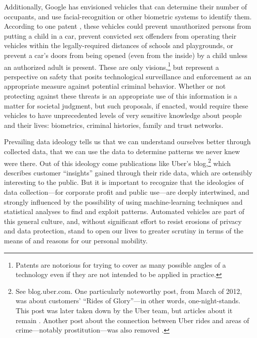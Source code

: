 Additionally, Google has envisioned vehicles that can determine their number of
occupants, and use facial-recognition or other biometric systems to
identify them. According to one patent \cite{predictPatent}, these vehicles could prevent
unauthorized persons from putting a child in a car, prevent convicted
sex offenders from operating their vehicles within the
legally-required distances of schools and playgrounds, or prevent a
car's doors from being opened (even from the inside) by a child unless
an authorized adult is present. These are only visions,\footnote{Patents
are notorious for trying to cover as many possible angles of a
technology even if they are not intended to be applied in practice.} 
but represent a perspective on safety 
that posits technological surveillance and enforcement as an
appropriate measure against potential criminal behavior. Whether or not protecting
against these threats is an appropriate use of this information is a
matter for societal judgment, but such proposals, if enacted, would
require these vehicles to have unprecedented levels of very sensitive
knowledge about people and their lives: biometrics, criminal
histories, family and trust networks. 


Prevailing data ideology tells us that we can understand ourselves better through
collected data, that we can use the data to determine patterns we never knew were
there. Out of this ideology come publications like Uber's
blog,\footnote{See blog.uber.com. One particularly noteworthy post,
  from March of 2012, was about customers' ``Rides of Glory''---in
  other words, one-night-stands. This post was later taken down by the
Uber team, but articles about it remain \cite{gigaomHarris}. Another
post about the connection between Uber rides and areas of
crime---notably prostitution---was also removed \cite{venturebeatObrien}.} which
describes customer ``insights'' gained through their ride data, which
are ostensibly interesting to the public. But it is important to
recognize that the ideologies of data collection---for corporate
profit and public use---are deeply intertwined, and strongly
influenced by the possibility of using machine-learning techniques and
statistical analyses to find and exploit patterns. Automated vehicles
are part of this general culture, and, without significant effort to
resist erosions of privacy and data protection, stand to open our lives
to greater scrutiny in terms of the means of and reasons for our
personal mobility.

